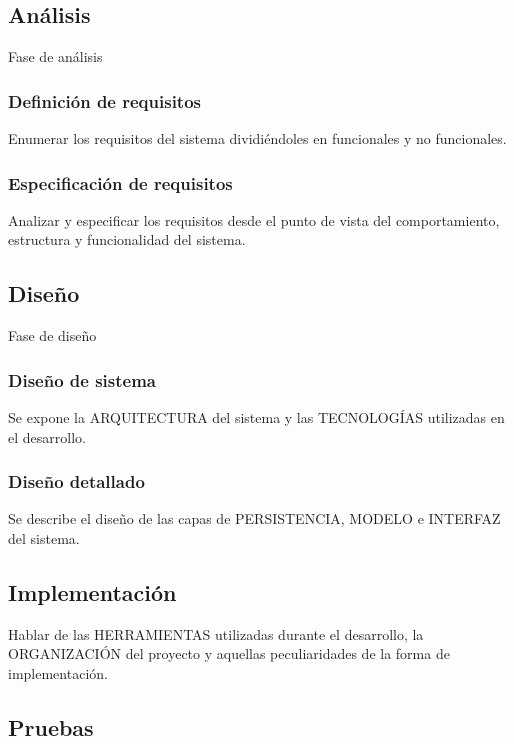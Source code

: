 \documentclass[12pt,a4paper,onecolumn,oneside]{report}
\begin{document}
\subsection{Análisis}

Fase de análisis


\subsubsection{Definición de requisitos}

Enumerar los requisitos del sistema dividiéndoles en funcionales y no funcionales.

\subsubsection{Especificación de requisitos}

Analizar y especificar los requisitos desde el punto de vista del comportamiento, estructura y funcionalidad del sistema.


\subsection{Diseño}

Fase de diseño

\subsubsection{Diseño de sistema}

Se expone la ARQUITECTURA del sistema y las TECNOLOGÍAS utilizadas en el desarrollo.

\subsubsection{Diseño detallado}

Se describe el diseño de las capas de PERSISTENCIA, MODELO e INTERFAZ del sistema.


\subsection{Implementación}

Hablar de las HERRAMIENTAS utilizadas durante el desarrollo, la ORGANIZACIÓN del proyecto y aquellas peculiaridades de la forma de implementación.

\subsection{Pruebas}
\end{document}
